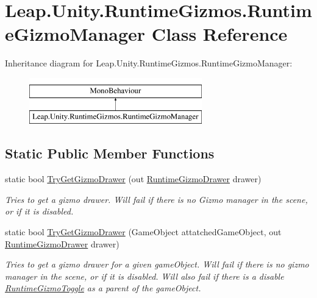 \hypertarget{class_leap_1_1_unity_1_1_runtime_gizmos_1_1_runtime_gizmo_manager}{}\section{Leap.\+Unity.\+Runtime\+Gizmos.\+Runtime\+Gizmo\+Manager Class Reference}
\label{class_leap_1_1_unity_1_1_runtime_gizmos_1_1_runtime_gizmo_manager}
Inheritance diagram for Leap.\+Unity.\+Runtime\+Gizmos.\+Runtime\+Gizmo\+Manager\+:\begin{figure}[H]
\begin{center}
\leavevmode
\includegraphics[height=2.000000cm]{class_leap_1_1_unity_1_1_runtime_gizmos_1_1_runtime_gizmo_manager}
\end{center}
\end{figure}
\subsection*{Static Public Member Functions}
\begin{DoxyCompactItemize}
\item 
static bool \mbox{\hyperlink{class_leap_1_1_unity_1_1_runtime_gizmos_1_1_runtime_gizmo_manager_a01d7d6c28b7ce9f019f8e2f8f55fa644}{Try\+Get\+Gizmo\+Drawer}} (out \mbox{\hyperlink{class_leap_1_1_unity_1_1_runtime_gizmos_1_1_runtime_gizmo_drawer}{Runtime\+Gizmo\+Drawer}} drawer)
\begin{DoxyCompactList}\small\item\em Tries to get a gizmo drawer. Will fail if there is no Gizmo manager in the scene, or if it is disabled. \end{DoxyCompactList}\item 
static bool \mbox{\hyperlink{class_leap_1_1_unity_1_1_runtime_gizmos_1_1_runtime_gizmo_manager_ae97fb1a40050e95d69d5cf7796ae3579}{Try\+Get\+Gizmo\+Drawer}} (Game\+Object attatched\+Game\+Object, out \mbox{\hyperlink{class_leap_1_1_unity_1_1_runtime_gizmos_1_1_runtime_gizmo_drawer}{Runtime\+Gizmo\+Drawer}} drawer)
\begin{DoxyCompactList}\small\item\em Tries to get a gizmo drawer for a given game\+Object. Will fail if there is no gizmo manager in the scene, or if it is disabled. Will also fail if there is a disable \mbox{\hyperlink{class_leap_1_1_unity_1_1_runtime_gizmos_1_1_runtime_gizmo_toggle}{Runtime\+Gizmo\+Toggle}} as a parent of the game\+Object. \end{DoxyCompactList}\end{DoxyCompactItemize}
